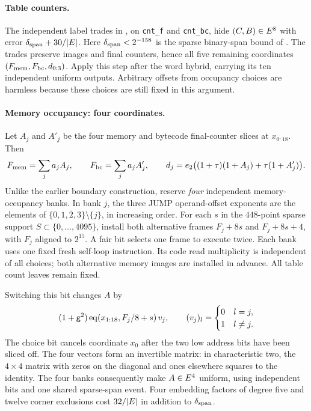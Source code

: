 \paragraph{Table counters.} The independent label trades in , on \texttt{cnt\_f} and \texttt{cnt\_bc}, hide $(C,B)\in E^8$ with error $\delta_{\rm span}+30/|E|$. Here $\delta_{\rm span}<2^{-158}$ is the sparse binary-span bound of . The trades preserve images and final counters, hence all five remaining coordinates $(F_{\rm mem},F_{\rm bc},d_{0:3})$. Apply this step after the word hybrid, carrying its ten independent uniform outputs. Arbitrary offsets from occupancy choices are harmless because these choices are still fixed in this argument.

\paragraph{Memory occupancy: four coordinates.} Let $A_j$ and $A'_j$ be the four memory and bytecode final-counter slices at $x_{0:18}$. Then
\[
 F_{\rm mem}=\sum_j a_jA_j,\qquad F_{\rm bc}=\sum_j a_jA'_j,
 \qquad d_j=e_2\bigl((1+\tau)(1+A_j)+\tau(1+A'_j)\bigr).
\]
Unlike the earlier boundary construction, reserve \emph{four} independent memory-occupancy banks. In bank $j$, the three JUMP operand-offset exponents are the elements of $\{0,1,2,3\}\setminus\{j\}$, in increasing order. For each $s$ in the $448$-point sparse support $S\subset\{0,\ldots,4095\}$, install both alternative frames $F_j+8s$ and $F_j+8s+4$, with $F_j$ aligned to $2^{15}$. A fair bit selects one frame to execute twice. Each bank uses one fixed fresh self-loop instruction. Its code read multiplicity is independent of all choices; both alternative memory images are installed in advance. All table count leaves remain fixed.

Switching this bit changes $A$ by
\[
 (1+\mathsf{g}^2)\operatorname{eq}(x_{1:18},F_j/8+s)\,v_j,
 \qquad (v_j)_l=\begin{cases}0&l=j,\\1&l\ne j.\end{cases}
\]
The choice bit cancels coordinate $x_0$ after the two low address bits have been sliced off. The four vectors form an invertible matrix: in characteristic two, the $4\times4$ matrix with zeros on the diagonal and ones elsewhere squares to the identity. The four banks consequently make $A\in E^4$ uniform, using independent bits and one shared sparse-span event. Four embedding factors of degree five and twelve corner exclusions cost $32/|E|$ in addition to $\delta_{\rm span}$.

